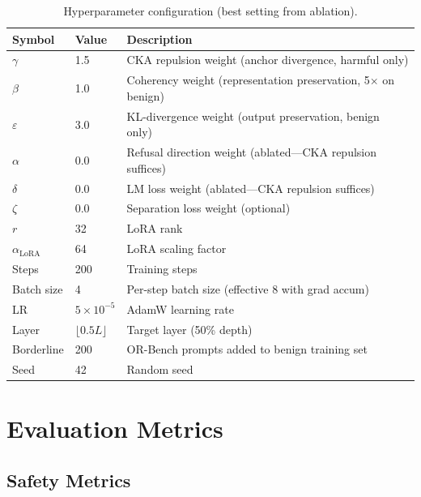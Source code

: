 \documentclass[11pt]{article}
\begin{document}
\begin{table}[h]
\centering
\caption{Hyperparameter configuration (best setting from ablation).}
\label{tab:hyperparams}
\begin{tabular}{@{}llp{7cm}@{}}
\toprule
\textbf{Symbol} & \textbf{Value} & \textbf{Description} \\
\midrule
$\gamma$ & 1.5 & CKA repulsion weight (anchor divergence, harmful only) \\
$\beta$ & 1.0 & Coherency weight (representation preservation, 5$\times$ on benign) \\
$\varepsilon$ & 3.0 & KL-divergence weight (output preservation, benign only) \\
$\alpha$ & 0.0 & Refusal direction weight (ablated---CKA repulsion suffices) \\
$\delta$ & 0.0 & LM loss weight (ablated---CKA repulsion suffices) \\
$\zeta$ & 0.0 & Separation loss weight (optional) \\
$r$ & 32 & LoRA rank \\
$\alpha_{\text{LoRA}}$ & 64 & LoRA scaling factor \\
Steps & 200 & Training steps \\
Batch size & 4 & Per-step batch size (effective 8 with grad accum) \\
LR & $5 \times 10^{-5}$ & AdamW learning rate \\
Layer & $\lfloor 0.5 L \rfloor$ & Target layer (50\% depth) \\
Borderline & 200 & OR-Bench prompts added to benign training set \\
Seed & 42 & Random seed \\
\bottomrule
\end{tabular}
\end{table}

\section{Evaluation Metrics}

\subsection{Safety Metrics}
\end{document}
